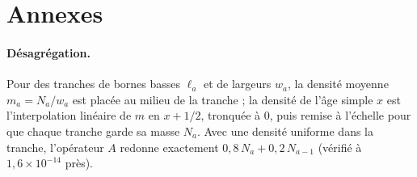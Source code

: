 \documentclass[11pt]{article}
\begin{document}


\appendix
\section{Annexes}
\paragraph{Désagrégation.} Pour des tranches de bornes basses $\ell_a$ et de largeurs $w_a$, la densité
moyenne $m_a = N_a / w_a$ est placée au milieu de la tranche ; la densité de l'âge simple $x$ est
l'interpolation linéaire de $m$ en $x + 1/2$, tronquée à 0, puis remise à l'échelle pour que chaque
tranche garde sa masse $N_a$. Avec une densité uniforme dans la tranche, l'opérateur $A$ redonne
exactement $0{,}8\,N_a + 0{,}2\,N_{a-1}$ (vérifié à $1{,}6 \times 10^{-14}$\mesure{} près).
\end{document}

